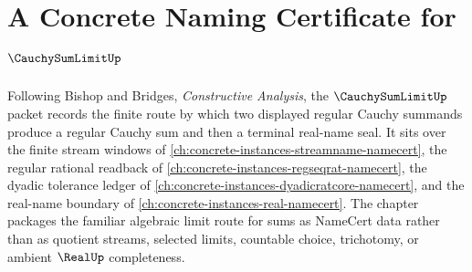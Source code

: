 \chapter{A Concrete Naming Certificate for $\CauchySumLimitUp$}
\label{ch:concrete-instances-cauchy-sum-limit-namecert}

Following Bishop and Bridges, \emph{Constructive Analysis}, the $\CauchySumLimitUp$ packet records the finite route by which two displayed regular Cauchy summands produce a regular Cauchy sum and then a terminal real-name seal. It sits over the finite stream windows of \autoref{ch:concrete-instances-streamname-namecert}, the regular rational readback of \autoref{ch:concrete-instances-regseqrat-namecert}, the dyadic tolerance ledger of \autoref{ch:concrete-instances-dyadicratcore-namecert}, and the real-name boundary of \autoref{ch:concrete-instances-real-namecert}. The chapter packages the familiar algebraic limit route for sums as NameCert data rather than as quotient streams, selected limits, countable choice, trichotomy, or ambient $\RealUp$ completeness.

